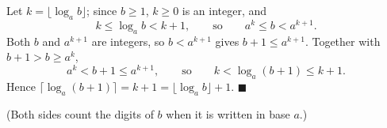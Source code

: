 Let $k=\lfloor\log_a b\rfloor$; since $b\ge1$, $k\ge0$ is an integer, and
\[k\le\log_a b<k+1,\qquad\text{so}\qquad a^k\le b<a^{k+1}.\]
Both $b$ and $a^{k+1}$ are integers, so $b<a^{k+1}$ gives $b+1\le a^{k+1}$. Together with $b+1>b\ge a^k$,
\[a^k<b+1\le a^{k+1},\qquad\text{so}\qquad k<\log_a(b+1)\le k+1 .\]
Hence $\lceil\log_a(b+1)\rceil=k+1=\lfloor\log_a b\rfloor+1$. $\blacksquare$

(Both sides count the digits of $b$ when it is written in base $a$.)
